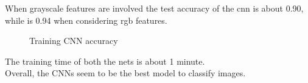\documentclass{article}
\begin{document}
When grayscale features are involved the test accuracy of the cnn is about 0.90, while is 0.94 when considering rgb features.
\begin{figure}[H] 
  \begin{adjustwidth}{-4cm}{-4cm}
     \centering
     \caption{Training CNN accuracy} \label{cnn} 
      \end{adjustwidth}
   \end{figure}
\noindent The training time of both the nets is about 1 minute.\\
Overall, the CNNs seem to be the best model to classify images.
\end{document}
